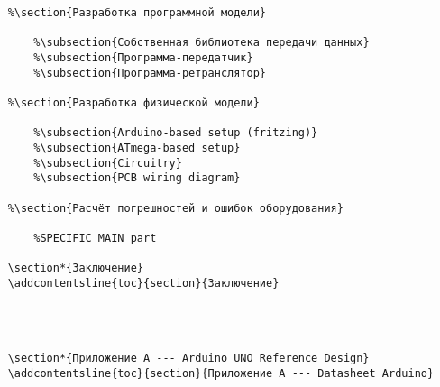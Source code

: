 \begin{verbatim}
    %\section{Разработка программной модели}

        %\subsection{Собственная библиотека передачи данных}
        %\subsection{Программа-передатчик}
        %\subsection{Программа-ретранслятор}

    %\section{Разработка физической модели}

        %\subsection{Arduino-based setup (fritzing)}
        %\subsection{ATmega-based setup}
        %\subsection{Circuitry}
        %\subsection{PCB wiring diagram}

    %\section{Расчёт погрешностей и ошибок оборудования}

        %SPECIFIC MAIN part

    \section*{Заключение}
    \addcontentsline{toc}{section}{Заключение}
    

    

    \section*{Приложение А --- Arduino UNO Reference Design}
    \addcontentsline{toc}{section}{Приложение А --- Datasheet Arduino}
       
\end{verbatim}

